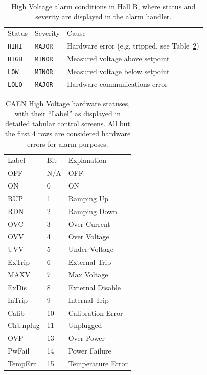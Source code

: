 \documentclass[amsmath,amssymb,notitlepage,11pt]{revtex4}
\begin{document}
\begin{table}[htpb]\centering
  \begin{tabular}{lll} \toprule[1.5pt]
    Status        & Severity & Cause \\ \cmidrule[0.5pt]{1-3}
    \texttt{HIHI} & \texttt{MAJOR} & Hardware error (e.g. tripped, see Table~\ref{tab:hvstat})\\
    \texttt{HIGH} & \texttt{MINOR} & Measured voltage above setpoint\\
    \texttt{LOW}  & \texttt{MINOR} & Measured voltage below setpoint\\
    \texttt{LOLO} & \texttt{MAJOR} & Hardware communications error\\
  \bottomrule[1.5pt]
  \end{tabular}
  \caption{High Voltage alarm conditions in Hall B, where status and severity are displayed in the alarm handler.\label{tab:hvalarm}}  
\end{table}

\begin{table}[htpb]\centering
  \begin{tabular}{lll}  \toprule[1.5pt]
    Label    & Bit & Explanation \\ \cmidrule[0.5pt]{1-3}
    OFF      & N/A & OFF\\
    ON       & 0 & ON\\
    RUP      & 1 & Ramping Up\\
    RDN      & 2 & Ramping Down\\
    OVC      & 3 & Over Current\\
    OVV      & 4 & Over Voltage\\
    UVV      & 5 & Under Voltage\\
    ExTrip   & 6 & External Trip\\
    MAXV     & 7 & Max Voltage\\
    ExDis    & 8 & External Disable\\
    InTrip   & 9 & Internal Trip\\
    Calib    & 10 & Calibration Error\\
    ChUnplug & 11 & Unplugged\\
    OVP      & 13 & Over Power\\
    PwFail   & 14 & Power Failure\\
    TempErr  & 15 & Temperature Error\\
    \bottomrule[1.5pt]
  \end{tabular}
  \caption{CAEN High Voltage hardware statuses, with their ``Label'' as displayed in detailed tabular control screens.  All but the first 4 rows are considered hardware errors for alarm purposes.\label{tab:hvstat}}  
\end{table}
\end{document}
